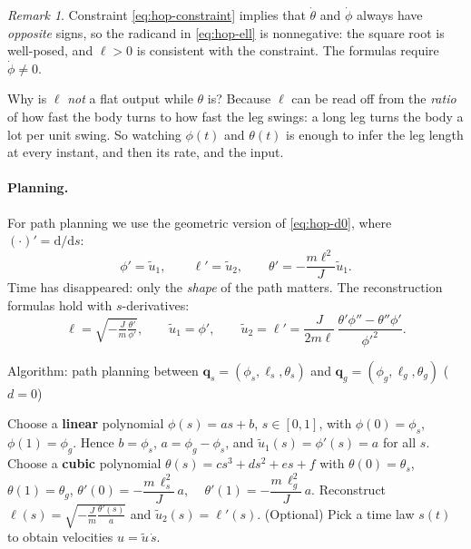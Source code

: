 \documentclass[11pt,a4paper]{article}
\theoremstyle{definition}
\theoremstyle{plain}
\theoremstyle{remark}
\newtheorem{remark}[definition]{Remark}
\newcommand{\q}{\boldsymbol{q}}
\begin{document}
\begin{remark}
Constraint \eqref{eq:hop-constraint} implies that $\dot\theta$ and $\dot\phi$ always have \emph{opposite} signs, so the radicand in \eqref{eq:hop-ell} is nonnegative: the square root is well-posed, and $\ell>0$ is consistent with the constraint. The formulas require $\dot\phi\neq0$.
\end{remark}

\begin{intuition}
Why is $\ell$ \emph{not} a flat output while $\theta$ is? Because $\ell$ can be read off from the \emph{ratio} of how fast the body turns to how fast the leg swings: a long leg turns the body a lot per unit swing. So watching $\phi(t)$ and $\theta(t)$ is enough to infer the leg length at every instant, and then its rate, and the input.
\end{intuition}

\paragraph{Planning.} For path planning we use the geometric version of \eqref{eq:hop-d0}, where $(\cdot)'=\mathrm d/\mathrm ds$:
\begin{equation}
  \phi'=\tilde u_1,\qquad \ell'=\tilde u_2,\qquad \theta'=-\frac{m\ell^2}{J}\tilde u_1 .
  \label{eq:hop-geo}
\end{equation}
Time has disappeared: only the \emph{shape} of the path matters. The reconstruction formulas hold with $s$-derivatives:
\[
  \ell=\sqrt{-\tfrac{J}{m}\tfrac{\theta'}{\phi'}},\qquad
  \tilde u_1=\phi',\qquad
  \tilde u_2=\ell'=\frac{J}{2m\ell}\,\frac{\theta'\phi''-\theta''\phi'}{\phi'^2}.
\]

\begin{algbox}{Algorithm: path planning between $\q_s=(\phi_s,\ell_s,\theta_s)$ and $\q_g=(\phi_g,\ell_g,\theta_g)$ ($d=0$)}
\begin{algorithmic}[1]
  \State Choose a \textbf{linear} polynomial $\phi(s)=as+b$, $s\in[0,1]$, with $\phi(0)=\phi_s$, $\phi(1)=\phi_g$.
  \Statex \hspace{\algorithmicindent} Hence $b=\phi_s$, $a=\phi_g-\phi_s$, and $\tilde u_1(s)=\phi'(s)=a$ for all $s$.
  \State Choose a \textbf{cubic} polynomial $\theta(s)=cs^3+ds^2+es+f$ with
  \Statex \hspace{\algorithmicindent} $\theta(0)=\theta_s$, $\theta(1)=\theta_g$,
  \Statex \hspace{\algorithmicindent} $\theta'(0)=-\dfrac{m\,\ell_s^2}{J}\,a$, $\quad\theta'(1)=-\dfrac{m\,\ell_g^2}{J}\,a$.
  \State Reconstruct $\ell(s)=\sqrt{-\frac{J}{m}\frac{\theta'(s)}{a}}$ and $\tilde u_2(s)=\ell'(s)$.
  \State (Optional) Pick a time law $s(t)$ to obtain velocities $u=\tilde u\,\dot s$.
\end{algorithmic}
\end{algbox}
\end{document}
